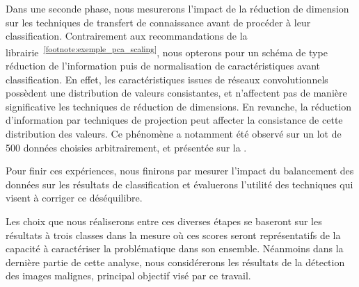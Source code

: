 Dans une seconde phase, nous mesurerons l'impact de la réduction de dimension sur les techniques de transfert de connaissance avant de procéder à leur classification. Contrairement aux recommandations de la librairie~\textsuperscript{\ref{footnote:exemple_pca_scaling}}, nous opterons pour un schéma de type réduction de l'information puis de normalisation de caractéristiques avant classification. En effet, les caractéristiques issues de réseaux convolutionnels possèdent une distribution de valeurs consistantes, et n'affectent pas de manière significative les techniques de réduction de dimensions. En revanche, la réduction d'information par techniques de projection peut affecter la consistance de cette distribution des valeurs. Ce phénomène a notamment été observé sur un lot de 500 données choisies arbitrairement, et présentée sur la .\par

Pour finir ces expériences, nous finirons par mesurer l'impact du balancement des données sur les résultats de classification et évaluerons l'utilité des techniques qui visent à corriger ce déséquilibre.\par

Les choix que nous réaliserons entre ces diverses étapes se baseront sur les résultats à trois classes dans la mesure où ces scores seront représentatifs de la capacité à caractériser la problématique dans son ensemble. Néanmoins dans la dernière partie de cette analyse, nous considérerons les résultats de la détection des images malignes, principal objectif visé par ce travail.\par

\addtocounter{footnote}{1}
 
